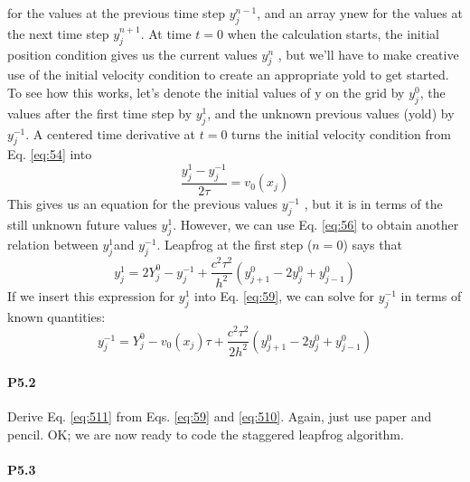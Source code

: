 for the values at the previous time step $ y_j^{n-1}$, and an array ynew for the values
at the next time step $ y_j^{n+1}$. At time $t = 0$ when the calculation starts, the initial
position condition gives us the current values $ y_j^n$ , but we\rq ll have to make creative
use of the initial velocity condition to create an appropriate yold to get started.
To see how this works, let\rq s denote the initial values of y on the grid by $ y_j^0 $, the
values after the first time step by $ y_j^{1} $, and the unknown previous values (yold) by
$ y_j^{-1} $. A centered time derivative at $t = 0$ turns the initial velocity condition from
Eq. \eqref{eq:54} into
\begin{equation}\label{eq:59}
\frac{y_j^1 - y_j^{-1}}{2 \tau} = v_0(x_j)
\end{equation}
This gives us an equation for the previous values $y_j^{-1}$ , but it is in terms of the
still unknown future values $y_j^{1}$. However, we can use Eq. \eqref{eq:56} to obtain another
relation between $y_j^{1}$and $y_j^{-1}$. Leapfrog at the first step ($n = 0$) says that
\begin{equation}\label{eq:510}
y_j^1 = 2Y^0_j - y_j^{-1} + \frac{c^2 \tau^2}{h^2}(y^0_{j+1}-2y^0_j+y^0_{j-1})
\end{equation}
If we insert this expression for $y^1_j$ into Eq. \eqref{eq:59}, we can solve for $y^{-1}_j $ in terms of
known quantities:
\begin{equation}\label{eq:511}
y_j^{-1} = Y^0_j - v_0(x_j)\tau + \frac{c^2 \tau^2}{2h^2}(y^0_{j+1}-2y^0_j+y^0_{j-1})
\end{equation}

\paragraph*{P5.2}Derive Eq. \eqref{eq:511} from Eqs. \eqref{eq:59} and \eqref{eq:510}. Again, just use paper and pencil.
OK; we are now ready to code the staggered leapfrog algorithm.
\paragraph*{P5.3}

